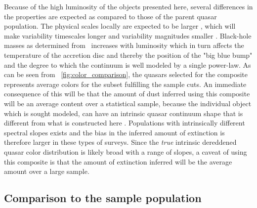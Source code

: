 \documentclass{aa}    %
\newcommand{\figref}[1]{\ref{fig:#1}}
\newcommand{\Fig}[1]{\figurename~\figref{#1}}
\newcommand{\fig}[1]{\Fig{#1}}
\newcommand{\sectlabel}[1]{\label{sect:#1}}
\newcommand{\mgii}{\ion{Mg}{ii}}
\begin{document}
Because of the high luminosity of the objects presented here, several differences in the properties are expected as compared to those of the parent quasar population. The physical scales locally are expected to be larger \citep{Bentz2013}, which will make variability timescales longer and variability magnitudes smaller \citep{VandenBerk2004, Schmidt2012}. Black-hole masses as determined from \mgii~increases with luminosity \citep{wu2015} which in turn affects the temperature of the accretion disc \citep{shakura1973, Pereyra2006} and thereby the position of the "big blue bump" and the degree to which the continuum is well modeled by a single power-law\citep[see also][for a discussion]{Lusso2015}. As can be seen from \fig{color_comparison}, the quasars selected for the composite represents average colors for the subset fulfilling the sample cuts. An immediate consequence of this will be that the amount of dust inferred using this composite will be an average content over a statistical sample, because the individual object which is sought modeled, can have an intrinsic quasar continuum shape that is different from what is constructed here \citep{Richards2003, Hopkins2004a}. Populations with intrinsically different spectral slopes exists \citep{Glikman2012, Krawczyk2015} and the bias in the inferred amount of extinction is therefore larger in these types of surveys. Since the \textit{true} intrinsic dereddened quasar color distribution is likely broad with a range of slopes, a caveat of using this composite is that the amount of extinction inferred will be the average amount over a large sample.



\subsection{Comparison to the sample population}  \sectlabel{sample_pop}
\end{document}
